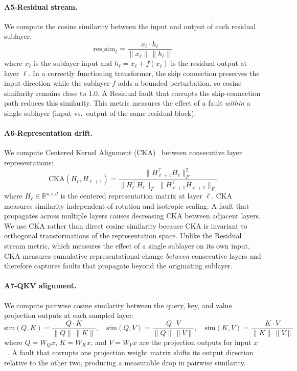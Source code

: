 \paragraph{A5-Residual stream.} We compute the cosine similarity between the input and output of each residual sublayer:
\begin{equation}
\text{res\_sim}_\ell = \frac{x_\ell \cdot h_\ell}{\|x_\ell\|\,\|h_\ell\|}
\label{eq:residual_sim}
\end{equation}
where $x_\ell$ is the sublayer input and $h_\ell = x_\ell + f(x_\ell)$ is the residual output at layer $\ell$. In a correctly functioning transformer, the skip connection preserves the input direction while the sublayer $f$ adds a bounded perturbation, so cosine similarity remains close to 1.0. A Residual fault that corrupts the skip-connection path reduces this similarity. This metric measures the effect of a fault \emph{within} a single sublayer (input vs.\ output of the same residual block).

\paragraph{A6-Representation drift.} We compute Centered Kernel Alignment (CKA)~\cite{kornblith2019similarity} between consecutive layer representations:
\begin{equation}
\text{CKA}(H_\ell, H_{\ell+1}) = \frac{\|H_{\ell+1}^\top H_\ell\|_F^2}{\|H_\ell^\top H_\ell\|_F \;\|H_{\ell+1}^\top H_{\ell+1}\|_F}
\label{eq:cka}
\end{equation}
where $H_\ell \in \mathbb{R}^{n \times d}$ is the centered representation matrix at layer $\ell$. CKA measures similarity independent of rotation and isotropic scaling. A fault that propagates across multiple layers causes decreasing CKA between adjacent layers. We use CKA rather than direct cosine similarity because CKA is invariant to orthogonal transformations of the representation space. Unlike the Residual stream metric, which measures the effect of a single sublayer on its own input, CKA measures cumulative representational change \emph{between} consecutive layers and therefore captures faults that propagate beyond the originating sublayer.

\paragraph{A7-QKV alignment.} We compute pairwise cosine similarity between the query, key, and value projection outputs at each sampled layer:
\begin{equation}
\text{sim}(Q, K) = \frac{Q \cdot K}{\|Q\|\,\|K\|}, \quad \text{sim}(Q, V) = \frac{Q \cdot V}{\|Q\|\,\|V\|}, \quad \text{sim}(K, V) = \frac{K \cdot V}{\|K\|\,\|V\|}
\label{eq:qkv_alignment}
\end{equation}
where $Q = W_Q x$, $K = W_K x$, and $V = W_V x$ are the projection outputs for input $x$~\cite{vaswani2017attention}. A fault that corrupts one projection weight matrix shifts its output direction relative to the other two, producing a measurable drop in pairwise similarity.

